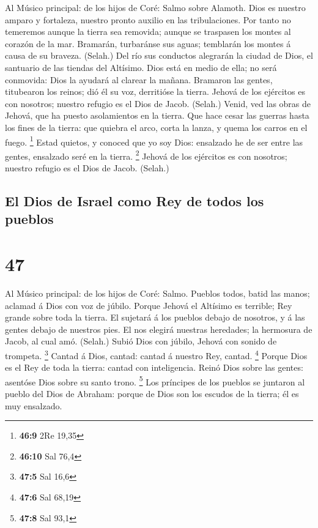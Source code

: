  Al Músico principal: de los hijos de Coré: Salmo sobre
Alamoth. Dios es nuestro amparo y fortaleza, nuestro pronto auxilio en
las tribulaciones.  Por tanto no temeremos aunque la tierra
sea removida; aunque se traspasen los montes al corazón de la mar.
 Bramarán, turbaránse sus aguas; temblarán los montes á
causa de su braveza. (Selah.)  Del río sus conductos
alegrarán la ciudad de Dios, el santuario de las tiendas del Altísimo.
 Dios está en medio de ella; no será conmovida: Dios la
ayudará al clarear la mañana.  Bramaron las gentes,
titubearon los reinos; dió él su voz, derritióse la tierra. 
Jehová de los ejércitos es con nosotros; nuestro refugio es el Dios de
Jacob. (Selah.)  Venid, ved las obras de Jehová, que ha
puesto asolamientos en la tierra.  Que hace cesar las
guerras hasta los fines de la tierra: que quiebra el arco, corta la
lanza, y quema los carros en el fuego. \footnote{\textbf{46:9} 2Re 19,35}
 Estad quietos, y conoced que yo soy Dios: ensalzado he de
ser entre las gentes, ensalzado seré en la tierra. \footnote{\textbf{46:10}
  Sal 76,4}  Jehová de los ejércitos es con nosotros;
nuestro refugio es el Dios de Jacob. (Selah.)

\hypertarget{el-dios-de-israel-como-rey-de-todos-los-pueblos}{%
\subsection{El Dios de Israel como Rey de todos los
pueblos}\label{el-dios-de-israel-como-rey-de-todos-los-pueblos}}

\hypertarget{section-46}{%
\section{47}\label{section-46}}

 Al Músico principal: de los hijos de Coré: Salmo. Pueblos
todos, batid las manos; aclamad á Dios con voz de júbilo. 
Porque Jehová el Altísimo es terrible; Rey grande sobre toda la tierra.
 El sujetará á los pueblos debajo de nosotros, y á las
gentes debajo de nuestros pies.  El nos elegirá nuestras
heredades; la hermosura de Jacob, al cual amó. (Selah.) 
Subió Dios con júbilo, Jehová con sonido de trompeta. \footnote{\textbf{47:5}
  Sal 16,6}  Cantad á Dios, cantad: cantad á nuestro Rey,
cantad. \footnote{\textbf{47:6} Sal 68,19}  Porque Dios es
el Rey de toda la tierra: cantad con inteligencia.  Reinó
Dios sobre las gentes: asentóse Dios sobre su santo trono. \footnote{\textbf{47:8}
  Sal 93,1}  Los príncipes de los pueblos se juntaron al
pueblo del Dios de Abraham: porque de Dios son los escudos de la tierra;
él es muy ensalzado.

